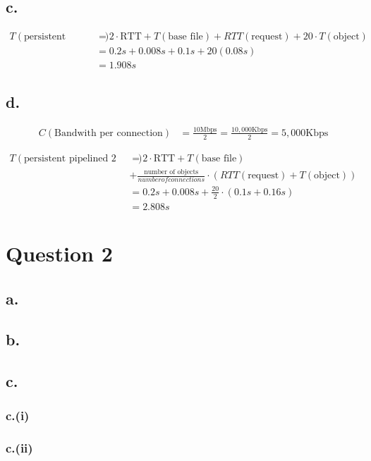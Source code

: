 \documentclass[12pt]{article}
\begin{document}
\subsection{c.}

\begin{align*}
    T(\text{persistent pipelined}) &= 2 \cdot \text{RTT} + T(\text{base file}) + RTT(\text{request}) + 20 \cdot T(\text{object}) \\
    &= 0.2s + 0.008s + 0.1s + 20(0.08s) \\
    &= 1.908s
\end{align*}

\subsection{d.}

\begin{align*}
    C(\text{Bandwith per connection}) &= \frac{10 \text{Mbps}}{2} = \frac{10,000 \text{Kbps}}{2} = 5,000 \text{Kbps}
\end{align*}


\begin{align*}
    T(\text{persistent pipelined 2 TCP}) &= 2 \cdot \text{RTT} + T(\text{base file})  \\
    &+ \frac{\text{number of objects}}{number of connections} \cdot (RTT(\text{request}) + T(\text{object})) \\
    &= 0.2s + 0.008s + \frac{20}{2} \cdot (0.1s + 0.16s) \\
    &= 2.808s
\end{align*}


\section{Question 2}

\subsection{a.}
\subsection{b.}
\subsection{c.}
\subsubsection{c.(i)}
\subsubsection{c.(ii)}


%
% 
% 
\end{document}
